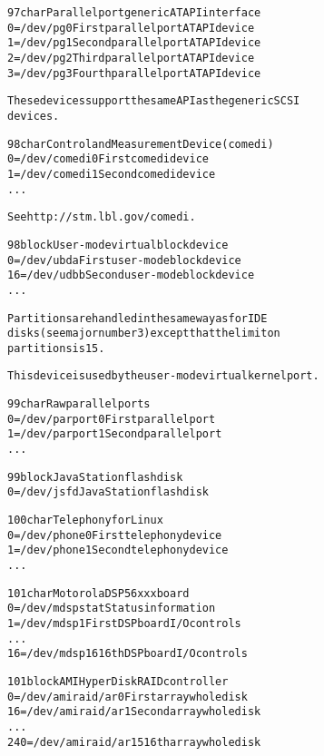 \documentclass[a4paper,8pt,english]{sphinxmanual}
\begin{document}
\begin{alltt}
  97 char       Parallel port generic ATAPI interface
                  0 = /dev/pg0          First parallel port ATAPI device
                  1 = /dev/pg1          Second parallel port ATAPI device
                  2 = /dev/pg2          Third parallel port ATAPI device
                  3 = /dev/pg3          Fourth parallel port ATAPI device

                These devices support the same API as the generic SCSI
                devices.

  98 char       Control and Measurement Device (comedi)
                  0 = /dev/comedi0      First comedi device
                  1 = /dev/comedi1      Second comedi device
                    ...

                See http://stm.lbl.gov/comedi.

  98 block      User-mode virtual block device
                  0 = /dev/ubda         First user-mode block device
                 16 = /dev/udbb         Second user-mode block device
                    ...

                Partitions are handled in the same way as for IDE
                disks (see major number 3) except that the limit on
                partitions is 15.

                This device is used by the user-mode virtual kernel port.

  99 char       Raw parallel ports
                  0 = /dev/parport0     First parallel port
                  1 = /dev/parport1     Second parallel port
                    ...

  99 block      JavaStation flash disk
                  0 = /dev/jsfd         JavaStation flash disk

 100 char       Telephony for Linux
                  0 = /dev/phone0       First telephony device
                  1 = /dev/phone1       Second telephony device
                    ...

 101 char       Motorola DSP 56xxx board
                  0 = /dev/mdspstat     Status information
                  1 = /dev/mdsp1        First DSP board I/O controls
                    ...
                 16 = /dev/mdsp16       16th DSP board I/O controls

 101 block      AMI HyperDisk RAID controller
                  0 = /dev/amiraid/ar0  First array whole disk
                 16 = /dev/amiraid/ar1  Second array whole disk
                    ...
                240 = /dev/amiraid/ar15 16th array whole disk


\end{alltt}
\end{document}
